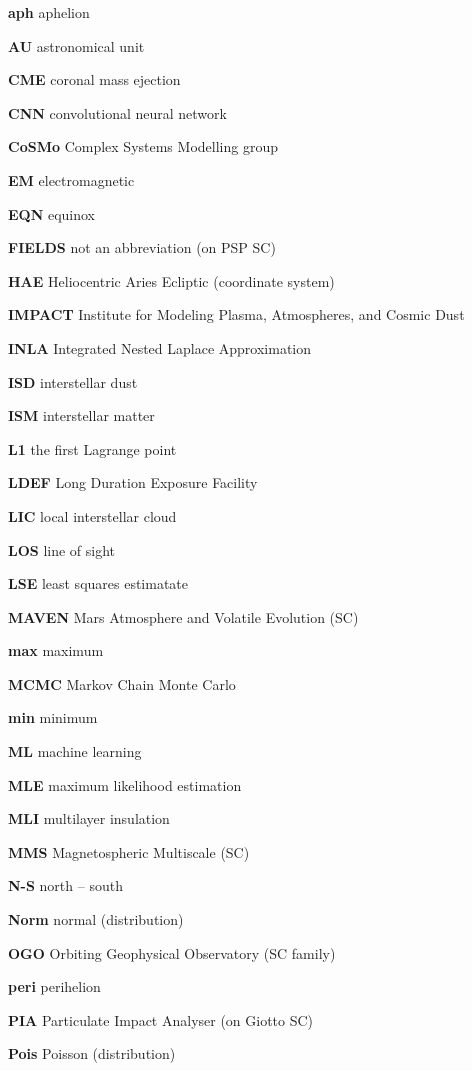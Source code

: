 \noindent

\textbf{aph} aphelion

\textbf{AU} astronomical unit

\textbf{CME} coronal mass ejection

\textbf{CNN} convolutional neural network

\textbf{CoSMo} Complex Systems Modelling group

\textbf{EM} electromagnetic

\textbf{EQN} equinox

\textbf{FIELDS} not an abbreviation (on PSP SC)

\textbf{HAE} Heliocentric Aries Ecliptic (coordinate system)

\textbf{IMPACT} Institute for Modeling Plasma, Atmospheres, and Cosmic Dust

\textbf{INLA} Integrated Nested Laplace Approximation

\textbf{ISD} interstellar dust

\textbf{ISM} interstellar matter

\textbf{L1} the first Lagrange point

\textbf{LDEF} Long Duration Exposure Facility

\textbf{LIC} local interstellar cloud

\textbf{LOS} line of sight

\textbf{LSE} least squares estimatate

\textbf{MAVEN}  Mars Atmosphere and Volatile Evolution (SC)

\textbf{max} maximum

\textbf{MCMC} Markov Chain Monte Carlo

\textbf{min} minimum

\textbf{ML} machine learning

\textbf{MLE} maximum likelihood estimation

\textbf{MLI} multilayer insulation

\textbf{MMS} Magnetospheric Multiscale (SC)

\textbf{N-S} north -- south

\textbf{Norm} normal (distribution) 

\textbf{OGO} Orbiting Geophysical Observatory (SC family)

\textbf{peri} perihelion

\textbf{PIA} Particulate Impact Analyser (on Giotto SC)

\textbf{Pois} Poisson (distribution)

